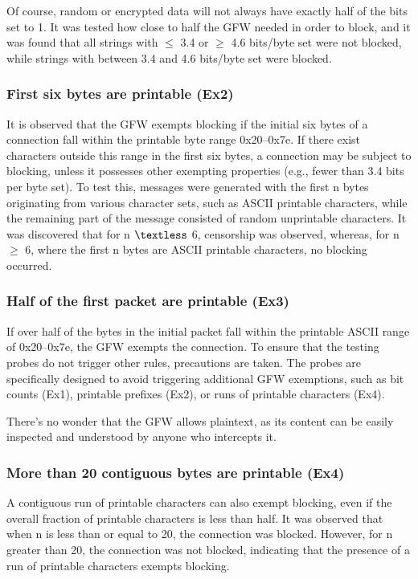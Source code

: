 Of course, random or encrypted data will not always have exactly half of the bits set to 1. It was tested how close to half the GFW needed in order to block, and it was found that all strings with $\leq$ 3.4 or $\geq$ 4.6 bits/byte set were not blocked, while strings with between 3.4 and 4.6 bits/byte set were blocked.

\subsubsection{\textbf{First six bytes are printable (Ex2)}}
It is observed that the GFW exempts blocking if the initial six bytes of a connection fall within the printable byte range 0x20–0x7e. If there exist characters outside this range in the first six bytes, a connection may be subject to blocking, unless it possesses other exempting properties (e.g., fewer than 3.4 bits per byte set). To test this, messages were generated with the first n bytes originating from various character sets, such as ASCII printable characters, while the remaining part of the message consisted of random unprintable characters. It was discovered that for n $\textless$ 6, censorship was observed, whereas, for n $\geq$ 6, where the first n bytes are ASCII printable characters, no blocking occurred.

\subsubsection{\textbf{Half of the first packet are printable (Ex3)}}
If over half of the bytes in the initial packet fall within the printable ASCII range of 0x20–0x7e, the GFW exempts the connection. To ensure that the testing probes do not trigger other rules, precautions are taken. The probes are specifically designed to avoid triggering additional GFW exemptions, such as bit counts (Ex1), printable prefixes (Ex2), or runs of printable characters (Ex4). 

There's no wonder that the GFW allows plaintext, as its content can be easily inspected and understood by anyone who intercepts it.

\subsubsection{\textbf{More than 20 contiguous bytes are printable (Ex4)}}
A contiguous run of printable characters can also exempt blocking, even if the overall fraction of printable characters is less than half. It was observed that when n is less than or equal to 20, the connection was blocked. However, for n greater than 20, the connection was not blocked, indicating that the presence of a run of printable characters exempts blocking.

